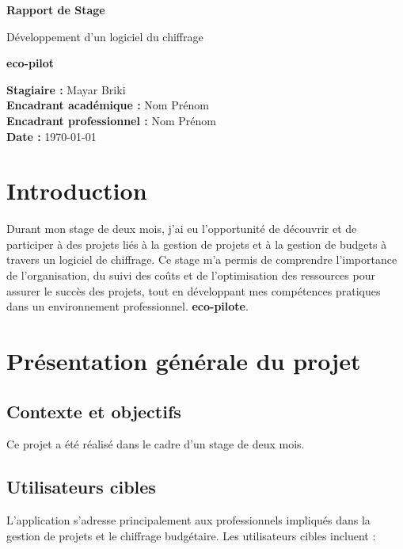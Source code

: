 \documentclass[12pt,a4paper]{report}
\begin{document}
\begin{titlepage}
    \centering
    \vspace*{2cm}
    {\Huge \textbf{Rapport de Stage} \par}
    \vspace{1.5cm}
    {\LARGE Développement d’un logiciel du chiffrage\par}
    \vspace{0.5cm}
    {\Large \textbf{eco-pilot} \par}
    \vspace{2cm}
    \vfill
    \begin{flushright}
        \textbf{Stagiaire :} Mayar Briki \\
        \textbf{Encadrant académique :} Nom Prénom \\
        \textbf{Encadrant professionnel :} Nom Prénom \\
        \textbf{Date :} \today
    \end{flushright}
\end{titlepage}


\chapter{Introduction}
Durant mon stage de deux mois, j’ai eu l’opportunité de découvrir et de participer à des projets liés à la gestion de projets et à la gestion de budgets à travers un logiciel de chiffrage. Ce stage m’a permis de comprendre l’importance de l’organisation, du suivi des coûts et de l’optimisation des ressources pour assurer le succès des projets, tout en développant mes compétences pratiques dans un environnement professionnel. \textbf{eco-pilote}.  

\chapter{Présentation générale du projet }
\section{Contexte et objectifs}
Ce projet a été réalisé dans le cadre d’un stage de deux mois.  
\section{Utilisateurs cibles}
L’application s’adresse principalement aux professionnels impliqués dans la gestion de projets et le chiffrage budgétaire. Les utilisateurs cibles incluent :
\end{document}
